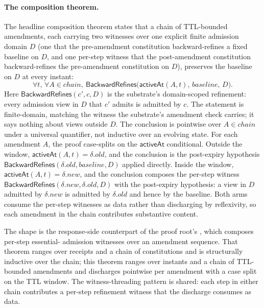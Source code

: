 \paragraph{The composition theorem.}
The headline composition theorem
 states that a
chain of TTL-bounded amendments, each carrying two witnesses over one
explicit finite admission domain $D$ (one that the pre-amendment
constitution backward-refines a fixed baseline on $D$, and one per-step
witness that the post-amendment constitution backward-refines the
pre-amendment constitution on $D$), preserves the baseline on $D$ at
every instant:
\[
  \forall t,\, \forall A \in \mathit{chain},\
    \mathsf{BackwardRefines}\bigl(\mathsf{activeAt}(A, t),\, \mathit{baseline},\, D\bigr).
\]
Here $\mathsf{BackwardRefines}(c', c, D)$ is the substrate's
domain-scoped refinement: every admission view in $D$ that $c'$ admits
is admitted by $c$. The statement is finite-domain, matching the
witness the substrate's amendment check carries; it says nothing about
views outside $D$. The conclusion is pointwise over $A \in \mathit{chain}$
under a universal quantifier, not inductive over an evolving state. For
each amendment $A$, the proof case-splits on the $\mathsf{activeAt}$
conditional. Outside the window,
$\mathsf{activeAt}(A, t) = \delta.\mathit{old}$, and the conclusion is
the post-expiry hypothesis
$\mathsf{BackwardRefines}(\delta.\mathit{old}, \mathit{baseline}, D)$
applied directly. Inside the window,
$\mathsf{activeAt}(A, t) = \delta.\mathit{new}$, and the conclusion
composes the per-step witness
$\mathsf{BackwardRefines}(\delta.\mathit{new}, \delta.\mathit{old}, D)$
with the post-expiry hypothesis: a view in $D$ admitted by
$\delta.\mathit{new}$ is admitted by $\delta.\mathit{old}$ and hence by
the baseline. Both arms consume the per-step witnesses as data rather
than discharging by reflexivity, so each amendment in the chain
contributes substantive content.

The shape is the response-side counterpart of the proof root's
, which composes per-step essential-
admission witnesses over an amendment sequence. That theorem
ranges over receipts and a chain of constitutions and is structurally
inductive over the chain; this theorem ranges over instants and a
chain of TTL-bounded amendments and discharges pointwise per amendment
with a case split on the TTL window. The witness-threading pattern is
shared: each step in either chain contributes a per-step refinement
witness that the discharge consumes as data.

